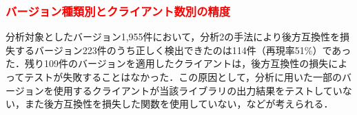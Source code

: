 \documentclass[submit]{ipsj}
\newcommand{\todo}[1]{\colorbox{yellow}{{\bf TODO}:}{\color{red} {\textbf{[#1]}}}}
\begin{document}
{%



\subsubsection{\textcolor{red}{バージョン種類別とクライアント数別の精度}}

分析対象としたバージョン1,955件において，分析2の手法により後方互換性を損失するバージョン223件のうち正しく検出できたのは114件（再現率51\%）であった．残り109件のバージョンを適用したクライアントは，後方互換性の損失によってテストが失敗することはなかった．この原因として，分析に用いた一部のバージョンを使用するクライアントが当該ライブラリの出力結果をテストしていない，また後方互換性を損失した関数を使用していない，などが考えられる．

}
\end{document}
